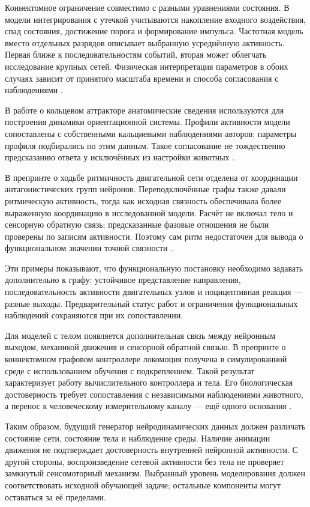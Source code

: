 Коннектомное ограничение совместимо с разными уравнениями состояния. В модели интегрирования с утечкой учитываются накопление входного воздействия, спад состояния, достижение порога и формирование импульса. Частотная модель вместо отдельных разрядов описывает выбранную усреднённую активность. Первая ближе к последовательностям событий, вторая может облегчать исследование крупных сетей. Физическая интерпретация параметров в обоих случаях зависит от принятого масштаба времени и способа согласования с наблюдениями \cite{s775,s212}.

В работе о кольцевом аттракторе анатомические сведения используются для построения динамики ориентационной системы. Профили активности модели сопоставлены с собственными кальциевыми наблюдениями авторов; параметры профиля подбирались по этим данным. Такое согласование не тождественно предсказанию ответа у исключённых из настройки животных \cite{s900}.

В препринте о ходьбе ритмичность двигательной сети отделена от координации антагонистических групп нейронов. Переподключённые графы также давали ритмическую активность, тогда как исходная связность обеспечивала более выраженную координацию в исследованной модели. Расчёт не включал тело и сенсорную обратную связь; предсказанные фазовые отношения не были проверены по записям активности. Поэтому сам ритм недостаточен для вывода о функциональном значении точной связности \cite{s909}.

Эти примеры показывают, что функциональную постановку необходимо задавать дополнительно к графу: устойчивое представление направления, последовательность активности двигательных узлов и ноцицептивная реакция --- разные выходы. Предварительный статус работ и ограничения функциональных наблюдений сохраняются при их сопоставлении.

Для моделей с телом появляется дополнительная связь между нейронным выходом, механикой движения и сенсорной обратной связью. В препринте о коннектомном графовом контроллере локомоция получена в симулированной среде с использованием обучения с подкреплением. Такой результат характеризует работу вычислительного контроллера и тела. Его биологическая достоверность требует сопоставления с независимыми наблюдениями животного, а перенос к человеческому измерительному каналу --- ещё одного основания \cite{s286}.

Таким образом, будущий генератор нейродинамических данных должен различать состояние сети, состояние тела и наблюдение среды. Наличие анимации движения не подтверждает достоверность внутренней нейронной активности. С другой стороны, воспроизведение сетевой активности без тела не проверяет замкнутый сенсомоторный механизм. Выбранный уровень моделирования должен соответствовать исходной обучающей задаче; остальные компоненты могут оставаться за её пределами.


